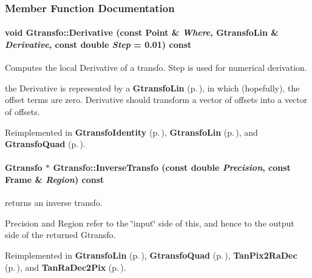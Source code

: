 \subsubsection{Member Function Documentation}
\paragraph{\setlength{\rightskip}{0pt plus 5cm}void Gtransfo::Derivative (const {\bf Point} \& {\em Where}, {\bf Gtransfo\-Lin} \& {\em Derivative}, const double {\em Step} = 0.01) const\hspace{0.3cm}{\tt  [virtual]}}\hfill\label{class_gtransfo_a9}


Computes the local Derivative of a transfo. Step is used for numerical derivation.

the Derivative is represented by a {\bf Gtransfo\-Lin} {\rm (p.\,\pageref{class_gtransfolin})}, in which (hopefully), the offset terms are zero. Derivative should  transform a vector of offsets into a vector of offsets. 

Reimplemented in {\bf Gtransfo\-Identity} {\rm (p.\,\pageref{class_gtransfoidentity_a7})}, {\bf Gtransfo\-Lin} {\rm (p.\,\pageref{class_gtransfolin_a5})}, and {\bf Gtransfo\-Quad} {\rm (p.\,\pageref{class_gtransfoquad_a9})}.
\paragraph{\setlength{\rightskip}{0pt plus 5cm}Gtransfo $\ast$ Gtransfo::Inverse\-Transfo (const double {\em Precision}, const {\bf Frame} \& {\em Region}) const\hspace{0.3cm}{\tt  [virtual]}}\hfill\label{class_gtransfo_a12}


returns an inverse transfo.

Precision and Region refer to the \char`\"{}input\char`\"{} side of this,  and hence to the output side of the returned Gtransfo. 

Reimplemented in {\bf Gtransfo\-Lin} {\rm (p.\,\pageref{class_gtransfolin_a14})}, {\bf Gtransfo\-Quad} {\rm (p.\,\pageref{class_gtransfoquad_a8})}, {\bf Tan\-Pix2Ra\-Dec} {\rm (p.\,\pageref{class_tanpix2radec_a9})}, and {\bf Tan\-Ra\-Dec2Pix} {\rm (p.\,\pageref{class_tanradec2pix_a7})}.
